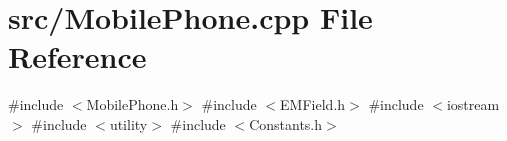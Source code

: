 \section{src/\+Mobile\+Phone.cpp File Reference}
\label{_mobile_phone_8cpp}
{\ttfamily \#include $<$Mobile\+Phone.\+h$>$}\newline
{\ttfamily \#include $<$E\+M\+Field.\+h$>$}\newline
{\ttfamily \#include $<$iostream$>$}\newline
{\ttfamily \#include $<$utility$>$}\newline
{\ttfamily \#include $<$Constants.\+h$>$}\newline
